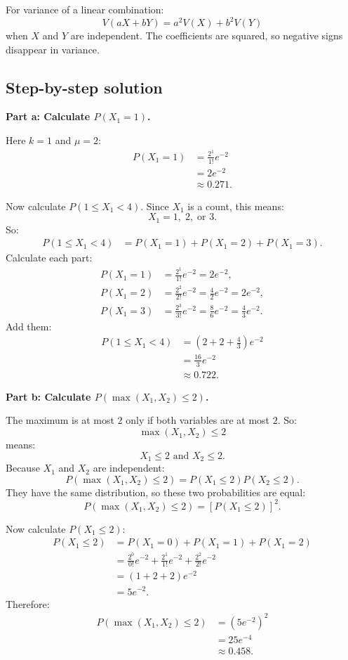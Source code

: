 \documentclass[11pt,a4paper]{article}
\begin{document}
For variance of a linear combination:
\[
V(aX+bY)=a^2V(X)+b^2V(Y)
\]
when \(X\) and \(Y\) are independent. The coefficients are squared, so negative signs disappear in variance.

\subsection*{Step-by-step solution}
\textbf{Part a: Calculate \(P(X_1=1)\).}

Here \(k=1\) and \(\mu=2\):
\begin{align*}
P(X_1=1)
&=\frac{2^1}{1!}e^{-2}\\
&=2e^{-2}\\
&\approx 0.271.
\end{align*}

Now calculate \(P(1\le X_1<4)\). Since \(X_1\) is a count, this means:
\[
X_1=1,\;2,\;\text{or }3.
\]
So:
\begin{align*}
P(1\le X_1<4)
&=P(X_1=1)+P(X_1=2)+P(X_1=3).
\end{align*}
Calculate each part:
\begin{align*}
P(X_1=1)&=\frac{2^1}{1!}e^{-2}=2e^{-2},\\
P(X_1=2)&=\frac{2^2}{2!}e^{-2}=\frac{4}{2}e^{-2}=2e^{-2},\\
P(X_1=3)&=\frac{2^3}{3!}e^{-2}=\frac{8}{6}e^{-2}=\frac{4}{3}e^{-2}.
\end{align*}
Add them:
\begin{align*}
P(1\le X_1<4)
&=\left(2+2+\frac{4}{3}\right)e^{-2}\\
&=\frac{16}{3}e^{-2}\\
&\approx 0.722.
\end{align*}

\textbf{Part b: Calculate \(P(\max(X_1,X_2)\le 2)\).}

The maximum is at most \(2\) only if both variables are at most \(2\). So:
\[
\max(X_1,X_2)\le 2
\]
means:
\[
X_1\le 2 \text{ and } X_2\le 2.
\]
Because \(X_1\) and \(X_2\) are independent:
\[
P(\max(X_1,X_2)\le 2)=P(X_1\le 2)P(X_2\le 2).
\]
They have the same distribution, so these two probabilities are equal:
\[
P(\max(X_1,X_2)\le 2)=[P(X_1\le 2)]^2.
\]

Now calculate \(P(X_1\le 2)\):
\begin{align*}
P(X_1\le 2)
&=P(X_1=0)+P(X_1=1)+P(X_1=2)\\
&=\frac{2^0}{0!}e^{-2}+\frac{2^1}{1!}e^{-2}+\frac{2^2}{2!}e^{-2}\\
&=(1+2+2)e^{-2}\\
&=5e^{-2}.
\end{align*}
Therefore:
\begin{align*}
P(\max(X_1,X_2)\le 2)
&=(5e^{-2})^2\\
&=25e^{-4}\\
&\approx 0.458.
\end{align*}
\end{document}
